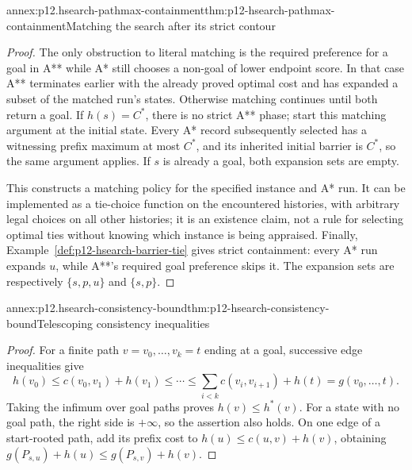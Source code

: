\begin{annexitem}{annex:p12.hsearch-pathmax-containment}{thm:p12-hsearch-pathmax-containment}{Matching the search after its strict contour}
\begin{proof}
The only obstruction to literal matching is the required preference for
a goal in A** while A* still chooses a non-goal of lower endpoint
score. In that case A** terminates earlier with the already proved
optimal cost and has expanded a subset of the matched run's states.
Otherwise matching continues until both return a goal. If \(h(s)=C^*\),
there is no strict A** phase; start this matching argument at the initial
state. Every A* record subsequently selected has a witnessing prefix
maximum at most \(C^*\), and its inherited initial barrier is
\(C^*\), so the same argument applies. If \(s\) is already a goal,
both expansion sets are empty.

This constructs a matching policy for the specified instance and A*
run. It can be implemented as a tie-choice function on the encountered
histories, with arbitrary legal choices on all other histories; it is
an existence claim, not a rule for selecting optimal ties without
knowing which instance is being appraised. Finally,
Example~\ref{def:p12-hsearch-barrier-tie} gives strict containment:
every A* run expands \(u\), while A**'s required goal preference skips
it. The expansion sets are respectively \(\{s,p,u\}\) and
\(\{s,p\}\).
\end{proof}
\end{annexitem}

\begin{annexitem}{annex:p12.hsearch-consistency-bound}{thm:p12-hsearch-consistency-bound}{Telescoping consistency inequalities}
\begin{proof}
For a finite path \(v=v_0,\ldots,v_k=t\) ending at a goal,
successive edge inequalities give
\[
 h(v_0)\le c(v_0,v_1)+h(v_1)
 \le\cdots\le\sum_{i<k}c(v_i,v_{i+1})+h(t)
 =g(v_0,\ldots,t).
\]
Taking the infimum over goal paths proves \(h(v)\le h^*(v)\).
For a state with no goal path, the right side is \(+\infty\), so
the assertion also holds. On one edge of a start-rooted path, add its
prefix cost to \(h(u)\le c(u,v)+h(v)\), obtaining
\(g(P_{s,u})+h(u)\le g(P_{s,v})+h(v)\).
\end{proof}
\end{annexitem}

